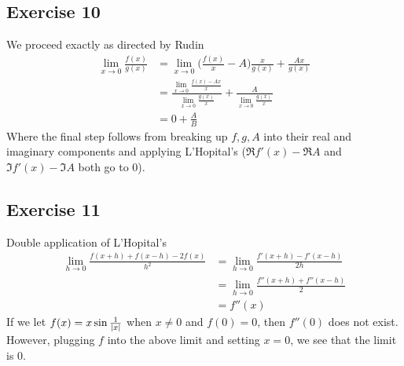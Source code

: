 \subsection{Exercise 10}
We proceed exactly as directed by Rudin
\begin{align*}
        \lim_{x \to 0} \frac{f(x)}{g(x)} &= \lim_{x \to 0} \bigg(\frac{f(x)}{x} - A\bigg) \frac{x}{g(x)} + \frac{Ax}{g(x)} \\
                                         &= \frac{\lim_{x \to 0} \frac{f(x) - Ax}{x}}{\lim_{x \to 0} \frac{g(x)}{x}} + \frac{A}{\lim_{x \to 0} \frac{g(x)}{x}} \\
                                         &= 0 + \frac{A}{B}
\end{align*}
Where the final step follows from breaking up $f, g, A$ into their real and imaginary components and applying
L'Hopital's ($\Re f'(x) - \Re A$ and $\Im f'(x) - \Im A$ both go to 0).

\subsection{Exercise 11}
Double application of L'Hopital's
\begin{align*}
        \lim_{h \to 0} \frac{f(x + h) + f(x - h) - 2f(x)}{h^2} &= \lim_{h \to 0} \frac{f'(x + h) - f'(x - h)}{2h} \\
                                                               &= \lim_{h \to 0} \frac{f''(x + h) + f''(x - h)}{2} \\
                                                               &= f''(x)
\end{align*}
If we let $f(x) = x \sin \frac{1}{\abs{x}}$ when $x \neq 0$ and $f(0) = 0$, then $f''(0)$ does not exist. 
However, plugging $f$ into the above limit and setting $x = 0$, we see that the limit is 0.

